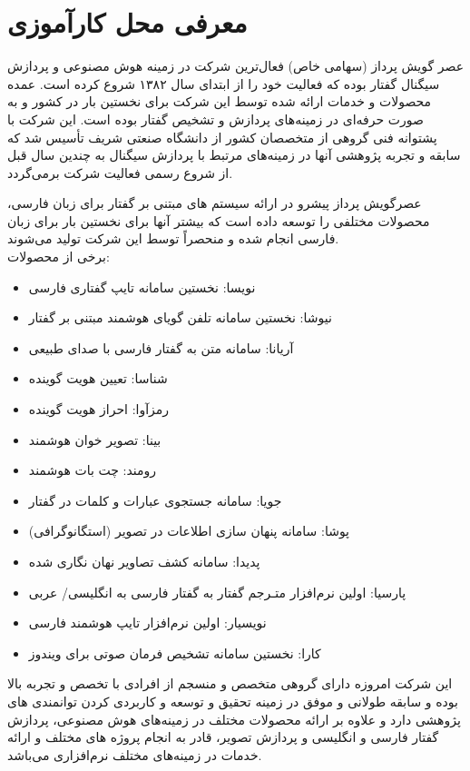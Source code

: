 \chapter{معرفی محل کارآموزی}

عصر گویش پرداز (سهامی خاص) فعال‌ترین شرکت در زمینه هوش مصنوعی و پردازش سیگنال گفتار بوده كه فعالیت خود را از ابتدای سال ۱۳۸۲ شروع كرده است. عمده محصولات و خدمات ارائه شده توسط این شرکت برای نخستین بار در کشور و به صورت حرفه‌ای در زمینه‌های پردازش و تشخیص گفتار بوده است. این شرکت با پشتوانه فنی گروهی از متخصصان کشور از دانشگاه صنعتی شریف تأسیس شد که سابقه و تجربه پژوهشی آنها در زمینه‌های مرتبط با پردازش سیگنال به چندین سال قبل از شروع رسمی فعالیت شرکت برمی‌گردد.

عصرگویش پرداز پیشرو در ارائه سیستم های مبتنی بر گفتار برای زبان فارسی، محصولات مختلفی را توسعه داده است که بیشتر آنها برای نخستین بار برای زبان فارسی انجام شده و منحصراً توسط این شرکت تولید می‌شوند.
\\

برخی از محصولات:
\begin{itemize}
	\item نویسا: نخستین سامانه تایپ گفتاری فارسی
	\item نیوشا: نخستین سامانه تلفن گویای هوشمند مبتنی بر گفتار
	\item آریانا: سامانه متن به گفتار فارسی با صدای طبیعی
	\item شناسا: تعیین هویت گوینده
	\item رمزآوا: احراز هویت گوینده
	\item بینا: تصویر خوان هوشمند
	\item رومند: چت بات هوشمند
	\item جویا: سامانه جستجوی عبارات و کلمات در گفتار
	\item پوشا: سامانه پنهان سازی اطلاعات در تصویر (استگانوگرافی)
	\item پدیدا: سامانه کشف تصاویر نهان نگاری شده
	\item پارسیا: اولین نرم‌افزار متـرجم گفتار به گفتار فارسی به انگلیسی/ عربی
	\item نویسیار: اولین نرم‌افزار تایپ هوشمند فارسی
	\item کارا: نخستین سامانه تشخیص فرمان صوتی برای ویندوز
\end{itemize}

این شرکت امروزه دارای گروهی متخصص و منسجم از افرادی با تخصص و تجربه بالا بوده و سابقه طولانی و موفق در زمینه تحقیق و توسعه و کاربردی کردن توانمندی های پژوهشی دارد و علاوه بر ارائه محصولات مختلف در زمینه‌های هوش مصنوعی، پردازش گفتار فارسی و انگلیسی و پردازش تصویر، قادر به انجام پروژه های مختلف و ارائه خدمات در زمینه‌های مختلف نرم‌افزاری می‌باشد.
\\

